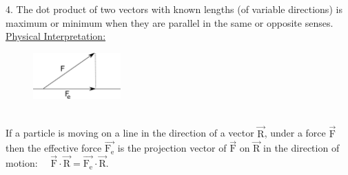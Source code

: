 \documentclass[12]{article}
\begin{document}
4.  The dot product of two vectors with known lengths (of variable directions) is maximum or minimum when they are parallel in the same or opposite senses.\\

\underline{Physical Interpretation:}
\begin{figure}
	\centering
\includegraphics[width=0.3\textwidth]{drawing3}
\end{figure}\\


If a particle is moving on a line in the direction of a vector $ \mathrm{ \vec{R} }$, under a force $ \mathrm{ \vec{F} } $ then the effective force $\mathrm{ \vec{F_e} } $ is the projection vector of $ \mathrm{ \vec{F} } $ on $\mathrm{ \vec{R} } $ in the direction of motion: \ \ $ \mathrm{ \vec {F} \cdot \vec{R} =\vec{F_e} \cdot \vec{R} } $.
\end{document}
